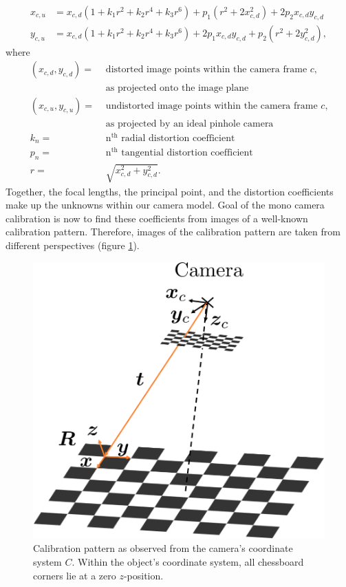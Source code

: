 \begin{align}
	x_{c,u} &= x_{c,d}(1+k_1r^2+k_2r^4+k_3r^6) + p_1(r^2+2x_{c,d}^2) + 2p_2x_{c,d}y_{c,d} 
	\label{eq::224_x_dist}\\
	y_{c,u} &= x_{c,d}(1+k_1r^2+k_2r^4+k_3r^6) + 2p_1x_{c,d}y_{c,d} + p_2(r^2+2y_{c,d}^2),
	\label{eq::224_y_dist}
\end{align}
where
\begin{align}
	(x_{c,d}, y_{c,d}) = &\,\,\text{distorted image points within the camera frame $c$,} 
	\nonumber\\
		                 &\,\,\text{as projected onto the image plane}
	\nonumber\\ 
	(x_{c,u}, y_{c,u}) = &\,\,\text{undistorted image points within the camera frame $c$,}
	\nonumber\\
	                     &\,\,\text{as projected by an ideal pinhole camera}
	\nonumber\\
	k_n = &\,\,\text{n$^\text{th}$ radial distortion coefficient}
	\nonumber\\
	p_n = &\,\,\text{n$^\text{th}$ tangential distortion coefficient}
	\nonumber\\
	r = &\,\,\sqrt{x_{c,d}^2+y_{c,d}^2}.
	\nonumber
\end{align}
Together, the focal lengths, the principal point, and the distortion coefficients make up the unknowns within our camera model. Goal of the mono camera calibration is now to find these coefficients from images of a well-known calibration pattern. Therefore, images of the calibration pattern are taken from different perspectives (figure \ref{fig::224_calibration_process}). 
\begin{figure}[h!]
	\centering
	\includegraphics[scale=.28]{chapters/02_background/img/calibration_process.png}
	\caption{Calibration pattern as observed from the camera's coordinate system $C$. Within the object's coordinate system, all chessboard corners lie at a zero $z$-position.}
	\label{fig::224_calibration_process}
\end{figure}
